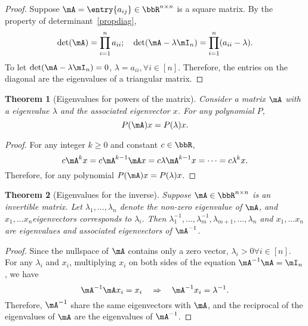 \documentclass[11pt]{article}
\theoremstyle{plain}
\newtheorem{thm}{Theorem}[section]
\theoremstyle{definition}
\begin{document}
\begin{proof}
Suppose $\mA = \entry{a_{ij}} \in \bbR^{n \times n}$ is a square matrix. By the property of determinant~\ref{propdiag}, 
\[ \det(\mA) = \prod_{i=1}^n a_{ii}  ; \quad \det(\mA - \lambda \mI_n) = \prod_{i=1}^n (a_{ii}-\lambda). \]
To let $\det(\mA - \lambda \mI_n) = 0$, $\lambda = a_{ii}, \forall i\in[n]$. Therefore, the entries on the diagonal are the eigenvalues of a triangular matrix.
\end{proof}

\begin{thm}[Eigenvalues for powers of the matrix]
	Consider a matrix $\mA$ with a eigenvalue $\lambda$ and the associated eigenvector $x$. For any polynomial $P$, 
	\[ P(\mA) x = P(\lambda) x. \]
\end{thm}
\begin{proof}
	For any integer $k \geq 0$ and constant $c \in \bbR$,
	\[ c\mA^k x = c\mA^{k-1} \mA x= c\lambda \mA^{k-1} x = \cdots = c\lambda^k x.\]
	Therefore, for any polynomial $P(\mA)x = P(\lambda)x$.
\end{proof}

\begin{thm}[Eigenvalues for the inverse]
Suppose $\mA \in \bbR^{n \times n}$ is an invertible matrix. Let $\lambda_1,...,\lambda_n$ denote the non-zero eigenvalue of $\mA$, and $x_1,...x_n$eigenvectors corresponds to $\lambda_i$. Then  $\lambda_1^{-1},...,\lambda_m^{-1}, \lambda_{m+1},...,\lambda_n $ and $x_1,...x_n$ are eigenvalues and associated eigenvectors of $\mA^{-1}$.
\end{thm}

\begin{proof}
	Since the nullspace of $\mA$ contains only a zero vector, $\lambda_i >0 \forall i \in [n]$. For any $\lambda_i$ and $x_i$, multiplying $x_i$ on both sides of the equation $\mA^{-1} \mA = \mI_n$, we have 
	\[ \mA^{-1} \mA x_i = x_i \quad \Rightarrow\quad  \mA^{-1} x_i = {\lambda}^{-1}.  \]
	Therefore, $\mA^{-1}$ share the same eigenvectors with $\mA$, and the reciprocal of the eigenvalues of $\mA$ are the eigenvalues of $\mA^{-1}$.
\end{proof}
\end{document}
